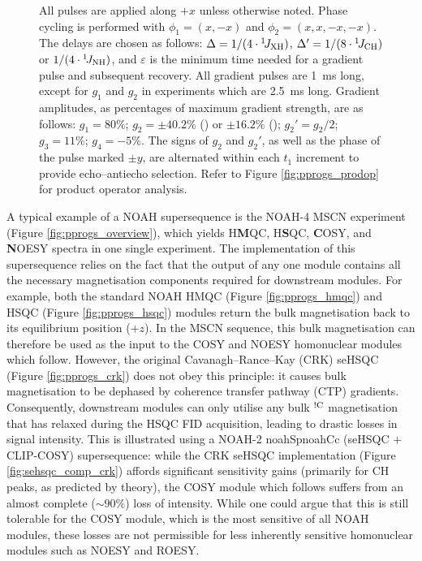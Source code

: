 \documentclass[11pt]{article}
\newcommand*{\noahtwo}[2]{\csname noah#1\endcsname\csname noah#2\endcsname}
\newcommand*{\carbon}{\ce{^{13}C}}
\newcommand*{\nitrogen}{\ce{^{15}N}}
\newcommand*{\onejxh}{{}^{1}\!J_{\ce{XH}}}
\newcommand*{\onejch}{{}^{1}\!J_{\ce{CH}}}
\newcommand*{\onejnh}{{}^{1}\!J_{\ce{NH}}}
\newcommand*{\magnnot}[1]{\ce{^1H}$^{!#1}$}
\newcommand*{\figref}[1]{Figure \ref{fig:#1}}
\begin{document}
\begin{figure}
{        All pulses are applied along $+x$ unless otherwise noted.
        Phase cycling is performed with $\phi_1 = (x, -x)$ and $\phi_2 = (x, x, -x, -x)$.
        The delays are chosen as follows: $\Delta = 1/(4\cdot\onejxh)$, $\Delta' = 1/(8\cdot\onejch)$ or $1/(4\cdot\onejnh)$, and $\varepsilon$ is the minimum time needed for a gradient pulse and subsequent recovery.
        All gradient pulses are \SI{1}{\ms} long, except for $g_1$ and $g_2$ in \nitrogen{} experiments which are \SI{2.5}{\ms} long.
        Gradient amplitudes, as percentages of maximum gradient strength, are as follows: $g_1 = 80\%$; $g_2 = \pm 40.2\%$ (\carbon{}) or $\pm 16.2\%$ (\nitrogen{}); ${g_2}' = g_2/2$; $g_3 = 11\%$; $g_4 = -5\%$.
        The signs of $g_2$ and ${g_2}'$, as well as the phase of the \carbon{} pulse marked $\pm y$, are alternated within each $t_1$ increment to provide echo--antiecho selection.
        Refer to \figref{pprogs_prodop} for product operator analysis.
    }
    \label{fig:pprogs}
\end{figure}

A typical example of a NOAH supersequence is the NOAH-4 MSCN experiment (\figref{pprogs_overview}), which yields \nitrogen{} H\textbf{M}QC, \carbon{} H\textbf{S}QC, \textbf{C}OSY, and \textbf{N}OESY spectra in one single experiment.\autocite{Kupce2017ACIE}
The implementation of this supersequence relies on the fact that the output of any one module contains all the necessary magnetisation components required for downstream modules.
For example, both the standard NOAH HMQC (\figref{pprogs_hmqc}) and HSQC (\figref{pprogs_hsqc}) modules return the bulk magnetisation back to its equilibrium position ($+z$).
In the MSCN sequence, this bulk magnetisation can therefore be used as the input to the COSY and NOESY homonuclear modules which follow.
However, the original Cavanagh--Rance--Kay (CRK) seHSQC (\figref{pprogs_crk}) does not obey this principle: it causes bulk magnetisation to be dephased by coherence transfer pathway (CTP) gradients.
Consequently, downstream modules can only utilise any bulk \magnnot{\ce{C}} magnetisation that has relaxed during the HSQC FID acquisition, leading to drastic losses in signal intensity.
This is illustrated using a NOAH-2 \noahtwo{Sp}{Cc} (seHSQC + CLIP-COSY\autocite{Koos2016ACIE}) supersequence: while the CRK seHSQC implementation (\figref{sehsqc_comp_crk}) affords significant sensitivity gains (primarily for CH peaks, as predicted by theory\autocite{sehsqc_sens}), the COSY module which follows suffers from an almost complete ($\sim 90\%$) loss of intensity.
While one could argue that this is still tolerable for the COSY module, which is the most sensitive of all NOAH modules, these losses are not permissible for less inherently sensitive homonuclear modules such as NOESY and ROESY.
\end{document}
